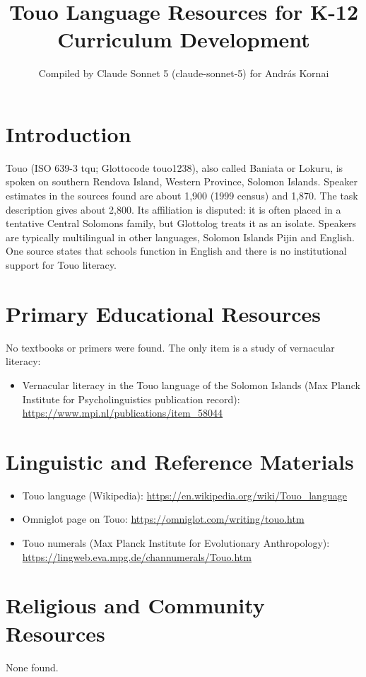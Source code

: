\documentclass[12pt]{article}
\title{Touo Language Resources for K-12 Curriculum Development}
\author{Compiled by Claude Sonnet 5 (claude-sonnet-5) for Andr\'as Kornai}
\date{}
\begin{document}
\maketitle

\section{Introduction}
Touo (ISO 639-3 tqu; Glottocode touo1238), also called Baniata or Lokuru, is spoken on southern Rendova Island, Western Province, Solomon Islands. Speaker estimates in the sources found are about 1,900 (1999 census) and 1,870. The task description gives about 2,800. Its affiliation is disputed: it is often placed in a tentative Central Solomons family, but Glottolog treats it as an isolate. Speakers are typically multilingual in other languages, Solomon Islands Pijin and English. One source states that schools function in English and there is no institutional support for Touo literacy.

\section{Primary Educational Resources}
No textbooks or primers were found. The only item is a study of vernacular literacy:
\begin{itemize}
\item Vernacular literacy in the Touo language of the Solomon Islands (Max Planck Institute for Psycholinguistics publication record): \url{https://www.mpi.nl/publications/item_58044}
\end{itemize}

\section{Linguistic and Reference Materials}
\begin{itemize}
\item Touo language (Wikipedia): \url{https://en.wikipedia.org/wiki/Touo_language}
\item Omniglot page on Touo: \url{https://omniglot.com/writing/touo.htm}
\item Touo numerals (Max Planck Institute for Evolutionary Anthropology): \url{https://lingweb.eva.mpg.de/channumerals/Touo.htm}
\end{itemize}

\section{Religious and Community Resources}
None found.
\end{document}
